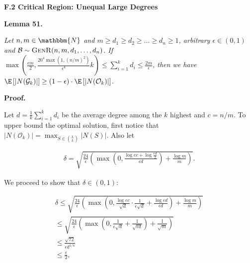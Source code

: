 \documentclass[10pt,a4paper]{article}
\begin{document}
\par\medskip\noindent\textbf{F.2 Critical Region: Unequal Large Degrees}\par





\par\medskip\noindent\textbf{\textbf{Lemma 51}\textbf{.}}\par



\emph{Let $n,m\in\mathbbm{N}$ and $m\geq d_{1}\geq d_{2}\geq\dots\geq d_{n}\geq 1$, arbitrary $\epsilon\in(0,1)$ and $\mathcal{B}\sim\textsc{GenR}(n,m,d_{1},\dots,d_{n})$.
If $\max\left(\frac{\epsilon m}{2},\frac{20^{4}\max(1,(n/m)^{2})}{\epsilon^{8}}k\right)\leq\sum_{i=1}^{k}d_{i}\leq\frac{2m}{\epsilon}$, then we have $\E\left[|N(\mathcal{G}_{k})|\right]\geq\left(1-\epsilon\right)\cdot\E\left[|N(\mathcal{O}_{k})|\right]$.}\par






\par\medskip\noindent\textbf{Proof.}\par



Let $d=\frac{1}{k}\sum_{i=1}^{k}{d_{i}}$ be the average degree among the $k$ highest and $c=n/m$.
To upper bound the optimal solution, first notice that $|N(\mathcal{O}_{k})|=\max_{S\in\binom{L}{k}}|N(S)|$.
Also let\par


\[\begin{gathered}
\delta=\sqrt{\frac{24}{\epsilon}\left(\max\left(0,\frac{\log{ec}+\log{\frac{\epsilon d}{2}}}{\epsilon d}\right)+\frac{\log{m}}{m}\right)}.
\end{gathered}\]


We proceed to show that $\delta\in(0,1)$:\par


\[\begin{gathered}
\displaystyle\delta \displaystyle\leq\sqrt{\frac{24}{\epsilon}\left(\max\left(0,\frac{\log{ec}}{\sqrt{d}}\cdot\frac{1}{\epsilon\sqrt{d}}+\frac{\log{\epsilon d}}{\epsilon d}\right)+\frac{\log{m}}{m}\right)} \\
\displaystyle\leq\sqrt{\frac{24}{\epsilon}\left(\max\left(0,\frac{1}{\epsilon\sqrt{d}}+\frac{1}{\sqrt{\epsilon d}}\right)+\frac{1}{\sqrt{m}}\right)} \\
\displaystyle\leq\frac{\sqrt{72}}{\epsilon d^{1/4}} \\
\displaystyle\leq\frac{\epsilon}{2},
\end{gathered}\]
\end{document}
